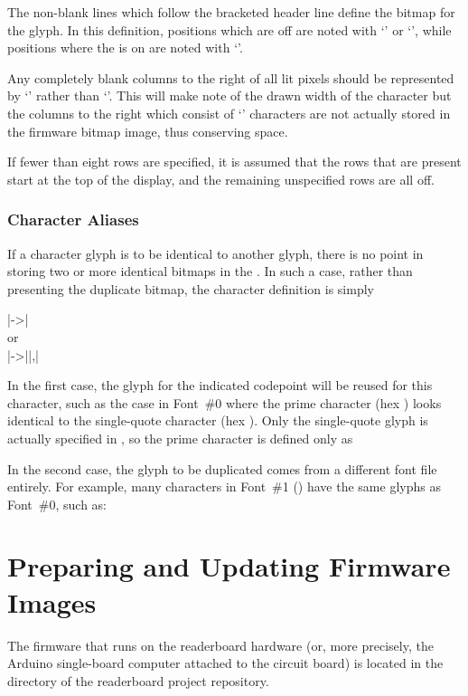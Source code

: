 The non-blank lines which follow the bracketed header line define
the bitmap for the glyph. In this definition, positions which are off
are noted with `' or `\z{|}', while positions where the  is
on are noted with `'.

Any completely blank columns to the right of all lit pixels should be
represented by `\z{|}' rather than `'. This will make note of the drawn
width of the character but the columns to the right which consist of `\z{|}'
characters are not actually stored in the firmware bitmap image, thus conserving
 space.

If fewer than eight rows are specified, it is assumed that the rows that are present
start at the top of the display, and the remaining unspecified rows are all off.

\subsection{Character Aliases}
If a character glyph is to be identical to another glyph, there is no point
in storing two or more identical bitmaps in the . In such a case,
rather than presenting the duplicate bitmap, the character definition
is simply
\begin{center}
	\begin{Coding}
		|->|\\
		or\\
		|->||,|
	\end{Coding}
\end{center}
In the first case, the glyph for the indicated codepoint will be reused for this character,
such as the case in Font~\#0 where the prime character (hex ) looks identical to
the single-quote character (hex ). Only the single-quote glyph is actually specified
in , so the prime character is defined only as

In the second case, the glyph to be duplicated comes from a different font file entirely.
For example, many characters in Font~\#1 () have the same glyphs
as Font~\#0, such as:

\chapter{Preparing and Updating Firmware Images}\label{chap:firmware}
The firmware that runs on the readerboard hardware (or, more precisely, the Arduino single-board
computer attached to the circuit board) is located in the  directory of the
readerboard project repository.

